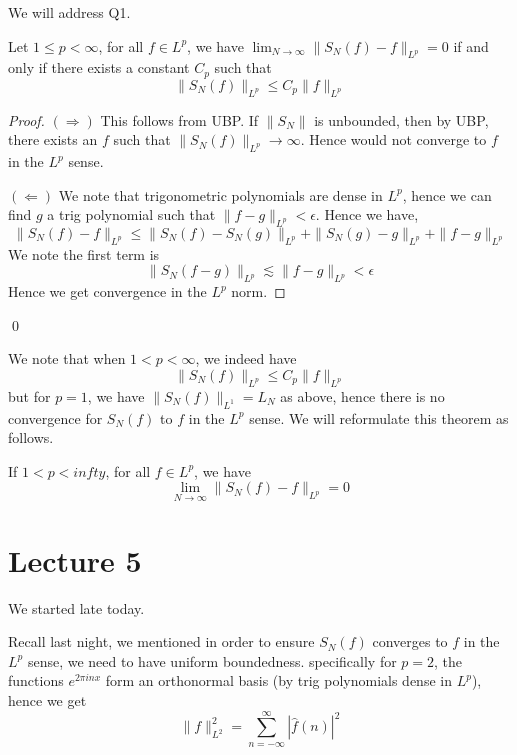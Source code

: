 We will address Q1.
\begin{lemma}
    Let $1\leq p<\infty$, for all $f\in L^p$, we have $\lim_{N\to\infty}\|S_N(f)-f\|_{L^p}=0$ if and only if there exists a constant $C_p$ such that
    \begin{equation*}
        \|S_N(f)\|_{L^p}\leq C_p\|f\|_{L^p}
    \end{equation*}
\end{lemma}
\begin{proof}
    $(\Rightarrow)$ This follows from UBP. If $\|S_N\|$ is unbounded, then by UBP, there exists an $f$ such that $\|S_N(f)\|_{L^p}\to\infty$. Hence would not converge to $f$ in the $L^p$ sense.

    $(\Leftarrow)$ We note that trigonometric polynomials are dense in $L^p$, hence we can find $g$ a trig polynomial such that $\|f-g\|_{L^p}<\epsilon$. Hence we have,
    \begin{equation*}
        \|S_N(f)-f\|_{L^p}\leq\|S_N(f)-S_N(g)\|_{L^p}+\|S_N(g)-g\|_{L^p}+\|f-g\|_{L^p}
    \end{equation*}
    We note the first term is
    \begin{equation*}
        \|S_N(f-g)\|_{L^p}\lesssim \|f-g\|_{L^p}<\epsilon
    \end{equation*}
    Hence we get convergence in the $L^p$ norm.
\end{proof}
\qed

We note that when $1<p<\infty$, we indeed have
\begin{equation*}
    \|S_N(f)\|_{L^p}\leq C_p\|f\|_{L^p}
\end{equation*}
but for $p=1$, we have $\|S_N(f)\|_{L^1}=L_N$ as above, hence there is no convergence for $S_N(f)$ to $f$ in the $L^p$ sense. We will reformulate this theorem as follows.

\begin{theorem}
    If $1<p<infty$, for all $f\in L^p$, we have
    \begin{equation*}
        \lim_{N\to\infty}\|S_N(f)-f\|_{L^p}=0
    \end{equation*}
\end{theorem}

\section{Lecture 5}
We started late today.

Recall last night, we mentioned in order to ensure $S_N(f)$ converges to $f$ in the $L^p$ sense, we need to have uniform boundedness. specifically for $p=2$, the functions $e^{2\pi inx}$ form an orthonormal basis (by trig polynomials dense in $L^p$), hence we get
\begin{equation*}
    \|f\|_{L^2}^2=\sum_{n=-\infty}^\infty |\hat{f}(n)|^2
\end{equation*}

